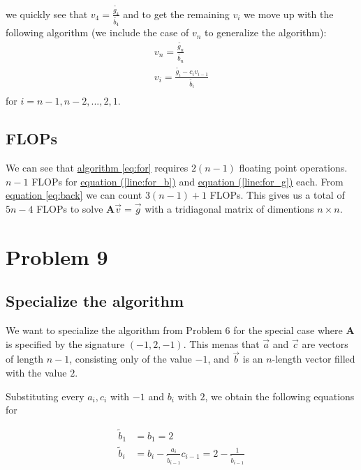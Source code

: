 \documentclass[english,notitlepage]{article}  %
\begin{document}
    we quickly see that $v_4 = \frac{\tilde{g_4}}{\tilde{b_4}}$ and to get the remaining $v_i$ we move up with the following algorithm (we include the case of $v_n$ to generalize the algorithm):
    \begin{gather}\label{eq:back}
        v_n = \frac{\tilde{g_n}}{\tilde{b_n}}\\
        v_i = \frac{\tilde{g_i} - c_iv_{i-1}}{\tilde{b_i}}\\
    \end{gather}
    for $i = n-1, n-2, ..., 2, 1$.

  \subsection*{FLOPs}

    We can see that \hyperref[eq:for]{algorithm \ref*{eq:for}} requires $2(n-1)$ floating point operations. $n-1$ FLOPs for \hyperref[line:for_b]{equation (\ref*{line:for_b})} and \hyperref[line:for_g]{equation (\ref*{line:for_g})} each. From \hyperref[eq:back]{equation \ref*{eq:back}} we can count $3(n-1) + 1$ FLOPs. This gives us a total of $5n - 4$ FLOPs to solve $\boldsymbol{A}\vec{v} = \vec{g}$ with a tridiagonal matrix of dimentions $n\times n$.

\section*{Problem 9}

  \subsection*{Specialize the algorithm}


    We want to specialize the algorithm from Problem 6 for the special case where $\boldsymbol{A}$ is specified by the signature $(-1, 2, -1)$. This menas that $\vec{a}$ and $\vec{c}$ are vectors of length $n-1$, consisting only of the value $-1$, and $\vec{b}$ is an $n$-length vector filled with the value $2$.

    Substituting every $a_i, c_i$ with $-1$ and $b_i$ with $2$, we obtain the following equations for

    \begin{equation}
      \begin{split}
        \tilde{b}_1 &= b_1 = 2 \\
        \tilde{b}_i &= b_i - \frac{a_i}{\tilde{b}_{i-1}} c_{i-1} = 2 - \frac{1}{\tilde{b}_{i-1}} \\ \label{eqn:specalg_b}
       \end{split}
    \end{equation}
\end{document}
